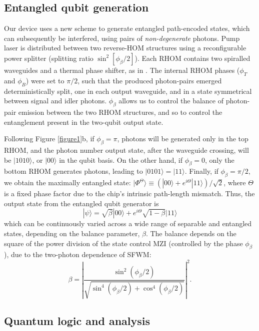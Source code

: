 \documentclass[
twocolumn,
 amsmath,amssymb,
 aps,
  twoside,
 superscriptaddress,
pra,
longbibliography
]{revtex4-1}
\begin{document}
\subsection{Entangled qubit generation}

Our device uses a new scheme to generate entangled path-encoded states, which can subsequently be interfered, using pairs of \emph{non-degenerate} photons. Pump laser is distributed between two reverse-HOM structures using a reconfigurable power splitter (splitting ratio $\sin^2[\phi_\beta/2]$). Each RHOM contains two spiralled waveguides and a thermal phase shifter, as in \cite{Silverstone:2013fu}. The internal RHOM phases ($\phi_T$ and $\phi_B$) were set to $\pi/2$, such that the produced photon-pairs emerged deterministically split, one in each output waveguide, and in a state symmetrical between signal and idler photons. $\phi_\beta$ allows us to control the balance of photon-pair emission between the two RHOM structures, and so to control the entanglement present in the two-qubit output state.

Following Figure \ref{figure1}b, if $\phi_\beta = \pi$, photons will be generated only in the top RHOM, and the photon number output state, after the waveguide crossing, will be $|\mathit{1010}\rangle$, or $|00\rangle$ in the qubit basis. On the other hand, if $\phi_\beta = 0$, only the bottom RHOM generates photons, leading to $|\mathit{0101}\rangle = |11\rangle$.  Finally, if $\phi_\beta = \pi/2$, we obtain the maximally entangled state: $|\Phi^\Theta\rangle \equiv (|00\rangle+e^{i \Theta}|11\rangle)/\sqrt{2}$, where $\Theta$ is a fixed phase factor due to the chip's intrinsic path-length mismatch. Thus, the output state from the entangled qubit generator is
\begin{equation}
  |\psi\rangle = \sqrt{\beta}|00\rangle + e^{i \Theta} \sqrt{1-\beta}|11\rangle
\label{equation1}
\end{equation}
which can be continuously varied across a wide range of separable and entangled states, depending on the balance parameter, $\beta$. The balance depends on the square of the power division of the state control MZI (controlled by the phase $\phi_\beta$), due to the two-photon dependence of SFWM:
\begin{equation}
  \beta = \left|\frac{\sin^2(\phi_\beta/2)}{\sqrt{\sin^4(\phi_\beta/2) + \cos^4(\phi_\beta/2)}}\right|^2.
  \label{bal}
\end{equation}



\subsection{Quantum logic and analysis}
\end{document}
